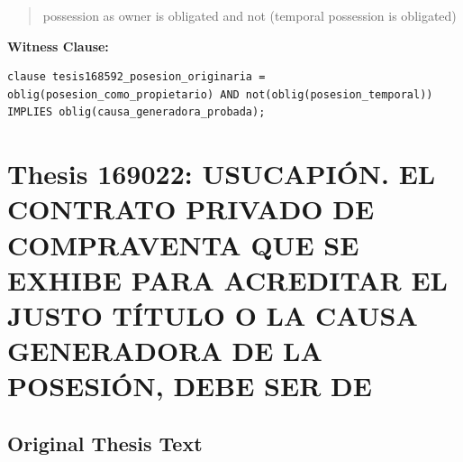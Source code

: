 \documentclass[11pt,a4paper]{article}
\begin{document}
\begin{quote}
possession as owner is obligated and not (temporal possession is obligated)
\end{quote}

\textbf{Witness Clause:}

\begin{lstlisting}[style=witnessstyle, language=Witness]
clause tesis168592_posesion_originaria = oblig(posesion_como_propietario) AND not(oblig(posesion_temporal)) IMPLIES oblig(causa_generadora_probada);
\end{lstlisting}

\newpage

\section{Thesis 169022: USUCAPIÓN. EL CONTRATO PRIVADO DE COMPRAVENTA QUE SE EXHIBE PARA ACREDITAR EL JUSTO TÍTULO O LA CAUSA GENERADORA DE LA POSESIÓN, DEBE SER DE}
\label{thesis:169022}

\subsection{Original Thesis Text}
\end{document}
